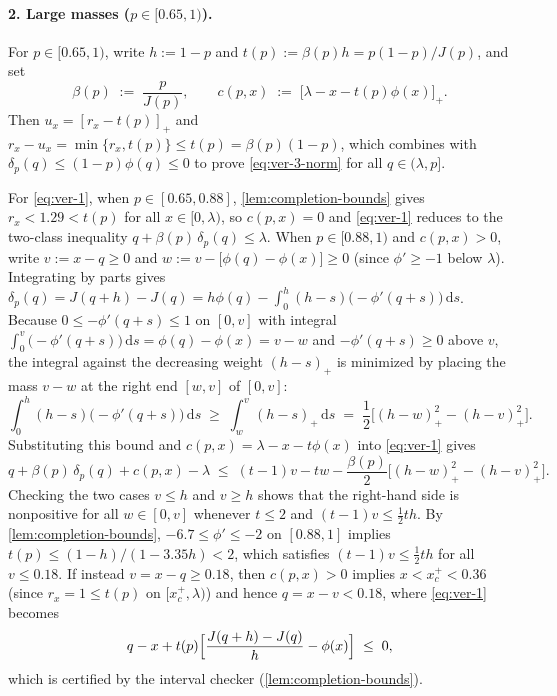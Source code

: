 \documentclass[11pt]{article}
\numberwithin{equation}{section}
\theoremstyle{plain}
\theoremstyle{definition}
\newcommand{\1}{\mathbf{1}}
\begin{document}
\paragraph{2. Large masses ($p \in [0.65, 1)$).}
For $p \in [0.65, 1)$, write $h := 1 - p$ and $t(p) := \beta(p)h = p(1 - p)/J(p)$, and set
\begin{equation}
  \beta(p) \;:=\; \frac{p}{J(p)},
  \qquad
  c(p, x) \;:=\; \bigl[\lambda - x - t(p)\phi(x)\bigr]_+.
  \label{eq:large-mass-correction}
\end{equation}
Then $u_x = [r_x - t(p)]_+$ and $r_x - u_x = \min\{r_x, t(p)\} \le t(p) = \beta(p)(1 - p)$, which combines with $\delta_p(q) \le (1 - p)\phi(q) \le 0$ to prove \cref{eq:ver-3-norm} for all $q \in (\lambda, p]$.

For \cref{eq:ver-1}, when $p \in [0.65, 0.88]$, \cref{lem:completion-bounds} gives $r_x < 1.29 < t(p)$ for all $x \in [0, \lambda)$, so $c(p, x) = 0$ and \cref{eq:ver-1} reduces to the two-class inequality $q + \beta(p)\,\delta_p(q) \le \lambda$. When $p \in [0.88, 1)$ and $c(p, x) > 0$, write $v := x - q \ge 0$ and $w := v - \bigl[\phi(q) - \phi(x)\bigr] \ge 0$ (since $\phi' \ge -1$ below $\lambda$). Integrating by parts gives $\delta_p(q) = J(q + h) - J(q) = h\phi(q) - \int_0^h (h - s)\bigl(-\phi'(q + s)\bigr)\,\mathrm{d}s$. Because $0 \le -\phi'(q + s) \le 1$ on $[0, v]$ with integral $\int_0^v \bigl(-\phi'(q + s)\bigr)\,\mathrm{d}s = \phi(q) - \phi(x) = v - w$ and $-\phi'(q + s) \ge 0$ above $v$, the integral against the decreasing weight $(h - s)_+$ is minimized by placing the mass $v - w$ at the right end $[w, v]$ of $[0, v]$:
\[
  \int_0^h (h - s)\bigl(-\phi'(q + s)\bigr)\,\mathrm{d}s \;\ge\; \int_w^v (h - s)_+\,\mathrm{d}s \;=\; \frac{1}{2}\bigl[(h - w)_+^2 - (h - v)_+^2\bigr].
\]
Substituting this bound and $c(p, x) = \lambda - x - t\phi(x)$ into \cref{eq:ver-1} gives
\[
  q + \beta(p)\,\delta_p(q) + c(p, x) - \lambda \;\le\; (t - 1)v - t w - \frac{\beta(p)}{2}\bigl[(h - w)_+^2 - (h - v)_+^2\bigr].
\]
Checking the two cases $v \le h$ and $v \ge h$ shows that the right-hand side is nonpositive for all $w \in [0, v]$ whenever $t \le 2$ and $(t - 1)v \le \frac{1}{2}t h$. By \cref{lem:completion-bounds}, $-6.7 \le \phi' \le -2$ on $[0.88, 1]$ implies $t(p) \le (1 - h)/(1 - 3.35h) < 2$, which satisfies $(t - 1)v \le \frac{1}{2}t h$ for all $v \le 0.18$. If instead $v = x - q \ge 0.18$, then $c(p, x) > 0$ implies $x < x_c^+ < 0.36$ (since $r_x = 1 \le t(p)$ on $[x_c^+, \lambda)$) and hence $q = x - v < 0.18$, where \cref{eq:ver-1} becomes
\begin{equation}
  q - x + t(p)\Bigl[\frac{J(q + h) - J(q)}{h} - \phi(x)\Bigr] \;\le\; 0,
  \label{eq:long-interval-ver1}
\end{equation}
which is certified by the interval checker (\cref{lem:completion-bounds}).
\end{document}

